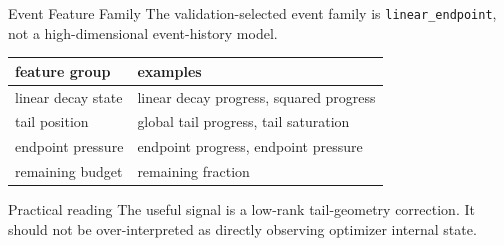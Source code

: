 \documentclass[fontset=fandol,aspectratio=169,10pt]{ctexbeamer}
\begin{document}
\begin{frame}{Event Feature Family}
  The validation-selected event family is \alert{\texttt{linear\_endpoint}}, not a high-dimensional event-history model.

  \begin{table}
    \centering
    \scriptsize
    \begin{tabular}{ll}
      \toprule
      feature group & examples\\
      \midrule
      linear decay state & linear decay progress, squared progress\\
      tail position & global tail progress, tail saturation\\
      endpoint pressure & endpoint progress, endpoint pressure\\
      remaining budget & remaining fraction\\
      \bottomrule
    \end{tabular}
  \end{table}

  \begin{block}{Practical reading}
    The useful signal is a low-rank tail-geometry correction. It should not be over-interpreted as directly observing optimizer internal state.
  \end{block}
\end{frame}
\end{document}
